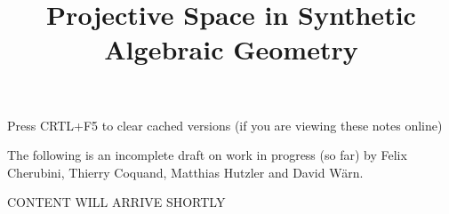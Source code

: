 \documentclass{../util/zariski}
\title{Projective Space in Synthetic Algebraic Geometry}
\begin{document}
\maketitle

\begin{center}
  \color{purple}
  \large{Press CRTL+F5 to clear cached versions}
  \large{(if you are viewing these notes online)}
\end{center}

The following is an incomplete draft on work in progress (so far)
by Felix Cherubini, Thierry Coquand, Matthias Hutzler and David Wärn.

CONTENT WILL ARRIVE SHORTLY

\printindex

\printbibliography
\end{document}
